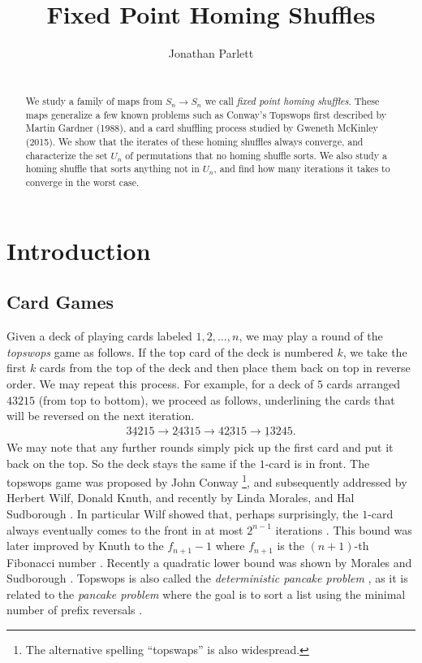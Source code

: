 \documentclass[final,nomarks]{dmtcs-episciences}
\title{Fixed Point Homing Shuffles}
\author{Jonathan Parlett}
\affiliation{Drexel University, Philadelphia, USA}
\theoremstyle{definition}
\theoremstyle{definition}
\theoremstyle{remark}
\begin{document}

\maketitle
\begin{abstract}\ \\
    We study a family of maps from $S_n \to S_n$ we call \emph{fixed point homing shuffles}. These maps generalize a few known problems such as Conway's Topswops first described by Martin Gardner (1988), and a card shuffling process studied by Gweneth McKinley (2015).
    We show that the iterates of these homing shuffles always converge, and characterize the set $U_n$ of permutations that no homing shuffle sorts.
    We also study a homing shuffle that sorts anything not in $U_n$, and find how many iterations it takes to converge in the worst case.
\end{abstract}

\section{Introduction}

\subsection{Card Games}

Given a deck of playing cards labeled $1,2,\dots,n$, we may play a round of the \textit{topswops} game as follows. If the top card of the deck is numbered $k$, we take the first $k$ cards from the top of the deck and then place them back on top in reverse order. We may repeat this process. For example, for a deck of $5$ cards arranged $43215$ (from top to bottom), we proceed as follows, underlining the cards that will be reversed on the next iteration.
\begin{align*}
\underline{342}15 \to \underline{24}315 \to \underline{4231}5 \to \underline{1}3245.
\end{align*}
We may note that any further rounds simply pick up the first card and put it back on the top. So the deck stays the same if the $1$-card is in front. The topswops game was proposed by John Conway \cite[Chapter Six]{gardner2020}\footnote{The alternative spelling ``topswaps'' is also widespread.}, and subsequently addressed by Herbert Wilf, Donald Knuth, and recently by Linda Morales, and Hal Sudborough \cite{gardner2020,TAoCP4A,morales2010}.  In particular Wilf showed that, perhaps surprisingly, the $1$-card always eventually comes to the front in at most $2^{n-1}$ iterations \cite[Chapter Six, Appendix]{gardner2020}. This bound was later improved by Knuth to the $f_{n+1}-1$ where $f_{n+1}$ is the $(n+1)$-th Fibonacci number \cite[\S 7.2.1.2, Exercise 108]{TAoCP4A}. Recently a quadratic lower bound was shown by Morales and Sudborough \cite{morales2010}. Topswops is also called the \textit{deterministic pancake problem} \cite{DWest}, as it is related to the \textit{pancake problem} where the goal is to sort a list using the minimal number of prefix reversals \cite{chitturi200918,cohen1995problem,gates1979bounds,heydari1997diameter}.
\end{document}
